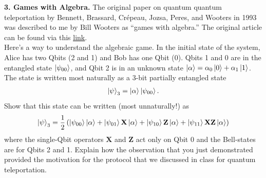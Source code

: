 \documentclass{book}
\theoremstyle{definition}
\newcommand{\al}{\alpha}
\newcommand{\X}{\mathbf{X}}
\newcommand{\f}[2]{\frac{#1}{#2}}
\newcommand{\lp}{\left(}
\newcommand{\rp}{\right)}
\newcommand{\Z}{\mathbf{Z}}
\begin{document}
\newpage






















\noindent \textbf{3. Games with Algebra.} The original paper on quantum quantum teleportation by Bennett,
Brassard, Cr\'epeau, Jozsa, Peres, and Wooters in 1993 was described to me by Bill Wooters
as ``games with algebra.'' The original article can be found via this \href{https://pdfs.semanticscholar.org/a3e4/5ffd3886f1a26f849514de3791054eebcc42.pdf}{\underline{link}}.\\

\noindent Here's a way to understand the algebraic game. In the initial state of the system, Alice has
two Qbits (2 and 1) and Bob has one Qbit (0).  Qbits 1 and 0 are in the entangled state $\ket{\psi_{00}}$, and Qbit 2 is in an unknown state $\ket{\al} = \al_0 \ket{0} + \al_1 \ket{1}$.  The state is written most naturally
as a 3-bit partially entangled state
\begin{align}
\ket{\psi}_3 = \ket{\al}\ket{\psi_{00}}.
\end{align}
Show that this state can be written (most unnaturally!) as
\begin{align}
\ket{\psi}_3 = \f{1}{2} \lp \ket{\psi_{00}}\ket{\al} + \ket{\psi_{01}}\X\ket{\al} + \ket{\psi_{10}}\Z\ket{\al} + \ket{\psi_{11}}\X \Z \ket{\al} \rp
\end{align}
where the single-Qbit operators $\X$ and $\Z$ act only on Qbit 0 and the Bell-states are for Qbits 2 and 1. Explain how the observation that you just demonstrated provided the motivation for the
protocol that we discussed in class for quantum teleportation.\\
\end{document}
